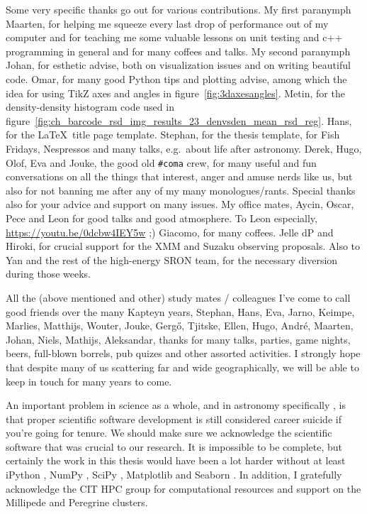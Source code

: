 Some very specific thanks go out for various contributions.
My first paranymph Maarten, for helping me squeeze every last drop of performance out of my computer and for teaching me some valuable lessons on unit testing and c++ programming in general and for many coffees and talks.
My second paranymph Johan, for esthetic advise, both on visualization issues and on writing beautiful code.
Omar, for many good Python tips and plotting advise, among which the idea for using TikZ axes and angles in figure~\ref{fig:3daxesangles}.
Metin, for the density-density histogram code used in figure~\ref{fig:ch_barcode_rsd_img_results_23_denvsden_mean_rsd_reg}.
Hans, for the \LaTeX\ title page template.
Stephan, for the thesis template, for Fish Fridays, Nespressos and many talks, e.g.\ about life after astronomy.
Derek, Hugo, Olof, Eva and Jouke, the good old \texttt{\#coma} crew, for many useful and fun conversations on all the things that interest, anger and amuse nerds like us, but also for not banning me after any of my many monologues/rants.
Special thanks also for your advice and support on many issues.
My office mates, Aycin, Oscar, Pece and Leon for good talks and good atmosphere.
To Leon especially, \url{https://youtu.be/0dcbw4IEY5w} ;)
Giacomo, for many coffees.
Jelle dP and Hiroki, for crucial support for the XMM and Suzaku observing proposals.
Also to Yan and the rest of the high-energy SRON team, for the necessary diversion during those weeks.

All the (above mentioned and other) study mates / colleagues I've come to call good friends over the many Kapteyn years, Stephan, Hans, Eva, Jarno, Keimpe, Marlies, Matthijs, Wouter, Jouke, Gerg\H{o}, Tjitske, Ellen, Hugo, Andr\'{e}, Maarten, Johan, Niels, Mathijs, Aleksandar, thanks for many talks, parties, game nights, beers, full-blown borrels, pub quizes and other assorted activities.
I strongly hope that despite many of us scattering far and wide geographically, we will be able to keep in touch for many years to come.

An important problem in science as a whole, and in astronomy specifically \citep{2016arXiv161003159M}, is that proper scientific software development is still considered career suicide if you're going for tenure.
We should make sure we acknowledge the scientific software that was crucial to our research.
It is impossible to be complete, but certainly the work in this thesis would have been a lot harder without at least iPython \citep{ipython}, NumPy \citep{numpy}, SciPy \citep{scipy}, Matplotlib \citep{matplotlib} and Seaborn \citep{seaborn}.
In addition, I gratefully acknowledge the CIT HPC group for computational resources and support on the Millipede and Peregrine clusters.

